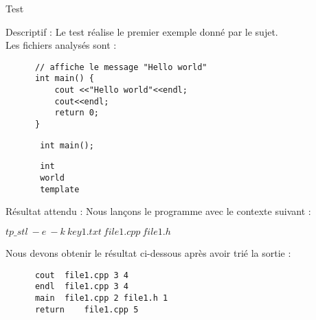 \documentclass{article}
\begin{document}
\newpage
  
  \begin{subsection}{Test }
    \begin{paragraph}{Descriptif :}
      Le test  réalise le premier exemple donné par le sujet.\\ Les fichiers analysés sont : 
      
      \begin{listing}[h!]
      \begin{verbatim}
	  // affiche le message "Hello world"
	  int main() {
	      cout <<"Hello world"<<endl;
	      cout<<endl;
	      return 0;
	  }
      \end{verbatim}
      \end{listing}
      
      \begin{listing}[h!]
	\begin{verbatim}
	   int main();
	\end{verbatim}
      \end{listing}
      
        \begin{listing}[h!]
	\begin{verbatim}
	   int
	   world
	   template
	\end{verbatim}
      \end{listing}
      
    \end{paragraph}
    
    \begin{paragraph}{Résultat attendu :} 
      Nous lançons le programme avec le contexte suivant :  
       \begin{center}
	\textbf{$tp\_stl\ -e\ -k\ key1.txt\ file1.cpp\ file1.h$}
      \end{center}
      
      Nous devons obtenir le résultat ci-dessous après avoir trié la sortie : 
      \begin{listing}[h!]
      \begin{verbatim}
	  cout	file1.cpp 3 4	
	  endl	file1.cpp 3 4	
	  main	file1.cpp 2	file1.h 1	
	  return	file1.cpp 5	
      \end{verbatim}
  
      \end{listing}
    \end{paragraph}

 \end{subsection}
     
\end{document}
